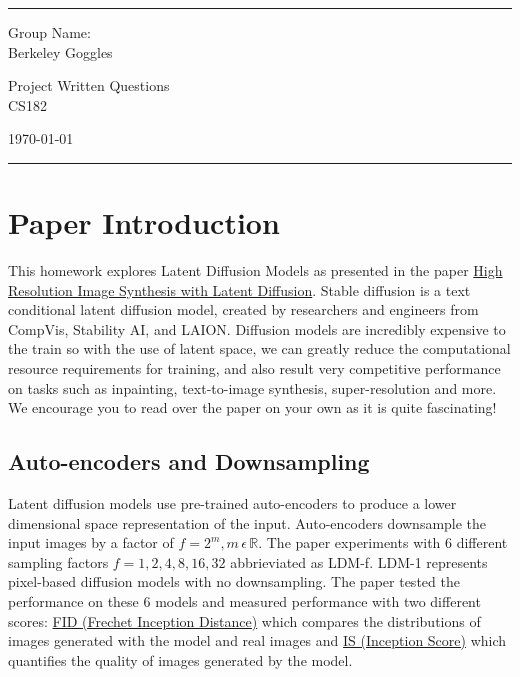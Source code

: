 \documentclass[a4paper]{article}
\begin{document}
\fancyhead[C]{}
\hrule \medskip %
\begin{minipage}{0.295\textwidth} 
\raggedright
\footnotesize
Group Name: \hfill \\
Berkeley Goggles
\end{minipage}
\begin{minipage}{0.4\textwidth} 
\centering 
\large 
Project Written Questions \\ 
\normalsize 
CS182\\ 
\end{minipage}
\begin{minipage}{0.295\textwidth} 
\raggedleft
\today\hfill\\
\end{minipage}
\medskip\hrule 
\bigskip
\section{Paper Introduction}
This homework explores Latent Diffusion Models as presented in the paper \href{https://arxiv.org/pdf/2112.10752.pdf}{High Resolution Image Synthesis with Latent Diffusion}. Stable diffusion is a text conditional latent diffusion model, created by researchers and engineers from CompVis, Stability AI, and LAION. Diffusion models are incredibly expensive to the train so with the use of latent space, we can greatly reduce the computational resource requirements for training, and also result very competitive performance on tasks such as inpainting, text-to-image synthesis, super-resolution and more. We encourage you to read over the paper on your own as it is quite fascinating!

\subsection{Auto-encoders and Downsampling}
Latent diffusion models use pre-trained auto-encoders to produce a lower dimensional space representation of the input.
Auto-encoders downsample the input images by a factor of \(f=2^m, m  \, \epsilon \, \mathbb{R}\). The paper experiments with 6 different sampling factors \(f={1, 2, 4, 8, 16, 32}\) abbrieviated as LDM-f. LDM-1 represents pixel-based diffusion models with no downsampling. The paper tested the performance on these 6 models and measured performance with two different scores: \href{https://en.wikipedia.org/wiki/Fr%C3%A9chet_inception_distance}{FID (Frechet Inception Distance)} which compares the distributions of images generated with the model and real images and \href{https://en.wikipedia.org/wiki/Inception_score}{IS (Inception Score)} which quantifies the quality of images generated by the model.
\end{document}
